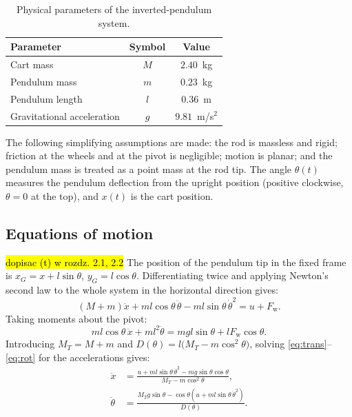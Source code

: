 \documentclass[twocolumn]{svjour3}
\begin{document}
\setlength\tabcolsep{4pt}
\begin{table}[htbp]
\caption{Physical parameters of the inverted-pendulum system.}
\label{tab:params}
\centering
\begin{small}
\begin{tabular}{lcc}
\hline
\rule{0pt}{3mm}Parameter & Symbol & Value \\
\hline
\rule{0pt}{3.5mm}Cart mass         & $M$ & $2.40$~kg \\
Pendulum mass     & $m$ & $0.23$~kg \\
Pendulum length   & $l$ & $0.36$~m  \\
Gravitational acceleration & $g$ & $9.81$~m/s$^{2}$ \\
\hline
\end{tabular}
\end{small}
\end{table}

The following simplifying assumptions are made: the rod is massless and
rigid; friction at the wheels and at the pivot is negligible; motion is planar; and the
pendulum mass is treated as a point mass at the rod tip. The angle $\theta(t)$ measures the
pendulum deflection from the upright position (positive clockwise, $\theta=0$ at the top),
and $x(t)$ is the cart position.

\subsection{Equations of motion}
\hl{dopisac (t) w rozdz. 2.1, 2.2}
The position of the pendulum tip in the fixed frame is
$x_G = x + l\sin\theta$, $y_G = l\cos\theta$.
Differentiating twice and applying Newton's second law to the whole system in the horizontal
direction gives:
\begin{equation}
(M{+}m)\ddot{x} + ml\cos\theta\,\ddot{\theta} - ml\sin\theta\,\dot{\theta}^{2} = u + F_\mathrm{w}.
\label{eq:trans}
\end{equation}
Taking moments about the pivot:
\begin{equation}
ml\cos\theta\,\ddot{x} + ml^{2}\ddot{\theta} = mgl\sin\theta + lF_\mathrm{w}\cos\theta.
\label{eq:rot}
\end{equation}
Introducing $M_T = M+m$ and $D(\theta)=l\bigl(M_T - m\cos^{2}\!\theta\bigr)$, solving
\eqref{eq:trans}--\eqref{eq:rot} for the accelerations gives:
\begin{align}
\ddot{x} &= \frac{u + ml\sin\theta\,\dot{\theta}^{2} - mg\sin\theta\cos\theta}{M_T - m\cos^{2}\!\theta},
\label{eq:xdd}\\[2pt]
\ddot{\theta} &= \frac{M_T g\sin\theta - \cos\theta\!\left(u + ml\sin\theta\,\dot{\theta}^{2}\right)}{D(\theta)}.
\label{eq:tdd}
\end{align}
\end{document}
